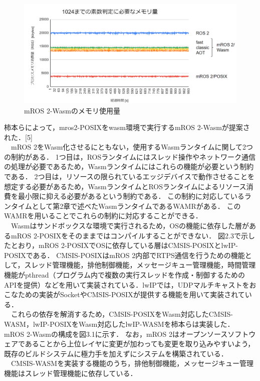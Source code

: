 \begin{figure}[ht]
    \centering
    \includegraphics[width=13cm]{images/fig3_mros2-wasm_memory.png}
    \caption{mROS 2-Wasmのメモリ使用量}
    \label{fig:mros2-wasm_configuration}
\end{figure}
柿本らによって，mros2-POSIXをwasm環境で実行するmROS 2-Wasmが提案された．[5]
\\　mROS 2をWasm化させるにともない，使用するWasmランタイムに関して2つの制約がある．
1つ目は，ROSランタイムにはスレッド操作やネットワーク通信の処理が必要であるため，Wasmランタイムにはこれらの機能が必要という制約である．
2つ目は，リソースの限られているエッジデバイスで動作させることを想定する必要があるため，WasmランタイムとROSランタイムによるリソース消費を最小限に抑える必要があるという制約である．
この制約に対応しているランタイムとして第2章で述べたWasmランタイムであるWAMRがある．
このWAMRを用いることでこれらの制約に対応することができる．
\\　Wasmはサンドボックスな環境で実行されるため，OSの機能に依存した層があるmROS 2-POSIXをそのままではコンパイルすることができない．
図2.3で示したとおり，mROS 2-POSIXでOSに依存している層はCMSIS-POSIXとlwIP-POSIXである．
CMSIS-POSIXはmROS 2内部でRTPS通信を行うための機能として，スレッド管理機能，排他制御機能，メッセージキュー管理機能，時間管理機能がpthread（プログラム内で複数の実行スレッドを作成・制御するためのAPIを提供）などを用いて実装されている．lwIPでは，UDPマルチキャストをおこなための実装がSocketやCMSIS-POSIXが提供する機能を用いて実装されている．
\\　これらの依存を解消するため，CMSIS-POSIXをWasm対応したCMSIS-WASM，lwIP-POSIXをWasm対応したlwIP-WASMを柿本らは実装した．
mROS 2-Wasmの構成を図3.1に示す．
なお，mROS 2はオープンソースソフトウェアであることから上位レイヤに変更が加わっても変更を取り込みやすいよう，既存のビルドシステムに極力手を加えずにシステムを構築されている．
\\　CMSIS-WASMを実装する機能のうち，排他制御機能，メッセージキュー管理機能はスレッド管理機能に依存している．
